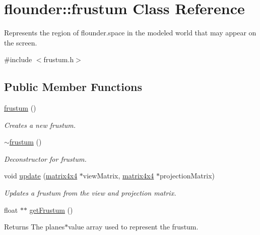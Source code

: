 \hypertarget{classflounder_1_1frustum}{}\section{flounder\+:\+:frustum Class Reference}
\label{classflounder_1_1frustum}


Represents the region of flounder.\+space in the modeled world that may appear on the screen.  




{\ttfamily \#include $<$frustum.\+h$>$}

\subsection*{Public Member Functions}
\begin{DoxyCompactItemize}
\item 
\hyperlink{classflounder_1_1frustum_a35fc0f2d80ba8f057abf39dadabb5a45}{frustum} ()
\begin{DoxyCompactList}\small\item\em Creates a new frustum. \end{DoxyCompactList}\item 
\hyperlink{classflounder_1_1frustum_a4496169c4a40c7d68447a3d1197e7fb4}{$\sim$frustum} ()
\begin{DoxyCompactList}\small\item\em Deconstructor for frustum. \end{DoxyCompactList}\item 
void \hyperlink{classflounder_1_1frustum_aad78881f3840433f864caf99c6cf05ea}{update} (\hyperlink{classflounder_1_1matrix4x4}{matrix4x4} $\ast$view\+Matrix, \hyperlink{classflounder_1_1matrix4x4}{matrix4x4} $\ast$projection\+Matrix)
\begin{DoxyCompactList}\small\item\em Updates a frustum from the view and projection matrix. \end{DoxyCompactList}\item 
\mbox{\label{classflounder_1_1frustum_a48c31a1320af527a49362c369b84af11}} 
float $\ast$$\ast$ \hyperlink{classflounder_1_1frustum_a48c31a1320af527a49362c369b84af11}{get\+Frustum} ()
\begin{DoxyCompactList}\small\item\em \begin{DoxyReturn}{Returns}
The planes$\ast$value array used to represent the frustum. 

\end{DoxyReturn}
\end{DoxyCompactList}$$
\end{DoxyCompactItemize}
